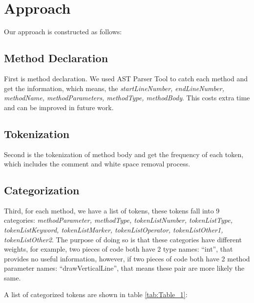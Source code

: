 \documentclass[../main.tex]{subfiles}
\begin{document}
\section{Approach}

Our approach is constructed as follows:

\subsection{Method Declaration}

First is method declaration. We used AST Parser Tool to catch each method and get the information, which means, the \textit{startLineNumber, endLineNumber, methodName, methodParameters, methodType, methodBody}. This costs extra time and can be improved in future work.

\subsection{Tokenization}

Second is the tokenization of method body and get the frequency of each token, which includes the comment and white space removal process.

\subsection{Categorization}

Third, for each method, we have a list of tokens, these tokens fall into 9 categories: \textit{methodParameter, methodType, tokenListNumber, tokenListType, tokenListKeyword, tokenListMarker, tokenListOperator, tokenListOther1, tokenListOther2}. The purpose of doing so is that these categories have different weights, for example, two pieces of code both have 2 type names: ``int'', that provides no useful information, however, if two pieces of code both have 2 method parameter names: ``drawVerticalLine'', that means these pair are more likely the same.

A list of categorized tokens are shown in table \ref{tab:Table_1}:\\
\end{document}
